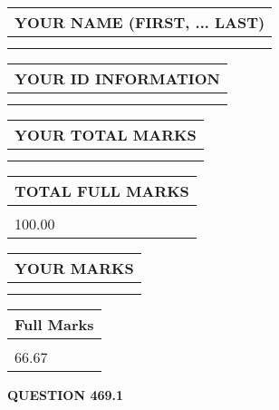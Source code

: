\documentclass{ctexart}
\begin{document}
   
   
   
\newpage 
\setcounter{page}{ 
   469001 } 
   
   
   
   
\noindent\begin{tabular}{|l|}
\hline
YOUR NAME (FIRST, ... LAST)  \\
\hline
 \\ 
 \\ 
\hline
\end{tabular}
\hspace{0.05in} \begin{tabular}{|l|}
\hline
 YOUR   ID   INFORMATION  \\
\hline
 \\ 
 \\ 
\hline
\end{tabular}
   
   
\vspace{0.2in}\noindent\begin{tabular}{|l|}
\hline
YOUR TOTAL MARKS  \\
\hline
 \\ 
 \\ 
\hline
\end{tabular}
\hspace{0.05in} \begin{tabular}{|l|}
\hline
TOTAL FULL MARKS  \\
\hline
 \\ 
100.00 \\
\hline
\end{tabular}
   
   
 \vspace{0.2in}
 
 
 
 
   
   
  
\vspace{0.2in}
  
\noindent\begin{tabular}{|l|}
\hline
 YOUR MARKS  \\
\hline
 \\ 
 \\ 
\hline
\end{tabular}
\hspace{0.05in} \begin{tabular}{|l|}
\hline
 Full Marks  \\
\hline
 \\ 
66.67 \\
\hline
\end{tabular}
{\textbf{\Large{QUESTION
469.1 
}}}
  
\end{document}

